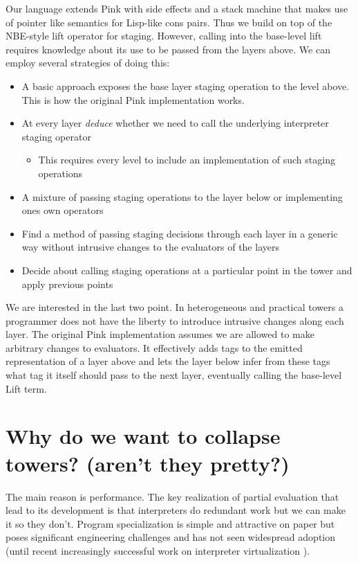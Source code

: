 \documentclass{article}
\begin{document}
Our language extends Pink with side effects and a stack machine that makes use of pointer like semantics for Lisp-like cons pairs. Thus we build on top of the NBE-style lift operator for staging. However, calling into
the base-level lift requires knowledge about its use to be passed from the layers above. We can employ several strategies of doing this:
\begin{itemize}
	\item A basic approach exposes the base layer staging operation to the level above. This is how the original Pink implementation works.
	\item At every layer \textit{deduce} whether we need to call the underlying interpreter staging operator
	\begin{itemize}
		\item This requires every level to include an implementation of such staging operations
	\end{itemize}
	\item A mixture of passing staging operations to the layer below or implementing ones own operators
	\item Find a method of passing staging decisions through each layer in a generic way without intrusive changes to the evaluators of the layers
	\item Decide about calling staging operations at a particular point in the tower and apply previous points
\end{itemize}
We are interested in the last two point. In heterogeneous and practical towers a programmer does not have the liberty to introduce intrusive changes along each layer.
The original Pink implementation assumes we are allowed to make arbitrary changes to evaluators. It effectively adds tags to the emitted representation of a layer above and lets the layer below infer from these tags
what tag it itself should pass to the next layer, eventually calling the base-level Lift term.

\section{Why do we want to collapse towers? (aren't they pretty?)}
The main reason is performance. The key realization of partial evaluation that lead to its development is that interpreters do redundant work but we can make it so they don't. Program specialization
is simple and attractive on paper but poses significant engineering challenges and has not seen widespread adoption (until recent increasingly successful work on interpreter virtualization \cite{wurthinger2013one}).
\end{document}

